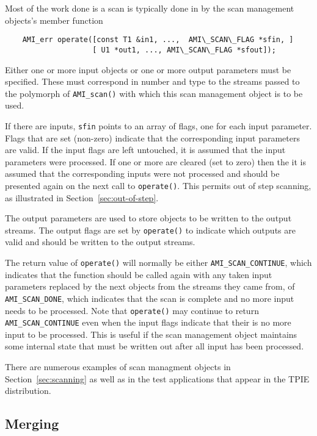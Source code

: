 Most of the work done is a scan is typically done in by the scan
management objects's member function
\begin{verbatim}
    AMI_err operate([const T1 &in1, ...,  AMI\_SCAN\_FLAG *sfin, ] 
                    [ U1 *out1, ..., AMI\_SCAN\_FLAG *sfout]);
\end{verbatim}

Either one or more input objects or one or more output parameters must
be specified.  These must correspond in number and type to the streams
passed to the polymorph of \verb|AMI_scan()| with which this scan
management object is to be used.

If there are inputs, \verb|sfin| points to an array of flags, one for
each input parameter.  Flags that are set (non-zero) indicate that the
corresponding input parameters are valid.  If the input flags are left
untouched, it is assumed that the input parameters were processed.  If
one or more are cleared (set to zero) then the it is assumed that the
corresponding inputs were not processed and should be presented again
on the next call to \verb|operate()|.  This permits out of step
scanning, as illustrated in
Section~\ref{sec:out-of-step}.

The output parameters are used to store objects to be written to the
output streams.  The output flags are set by \verb|operate()| to
indicate which outputs are valid and should be written to the output
streams.

The return value of \verb|operate()| will normally be either
\verb|AMI_SCAN_CONTINUE|, which indicates that the function should be
called again with any taken input parameters replaced by the next
objects from the streams they came from, of \verb|AMI_SCAN_DONE|,
which indicates that the scan is complete and no more input needs to
be processed.  Note that \verb|operate()| may continue to return
\verb|AMI_SCAN_CONTINUE| even when the input flags indicate that their
is no more input to be processed.  This is useful if the scan
management object maintains some internal state that must be written
out after all input has been processed.

There are numerous examples of scan managment objects in
Section~\ref{sec:scanning} as well as in the test applications that
appear in the TPIE distribution.


\subsection{Merging}
\label{sec:ref-ami-merge}

